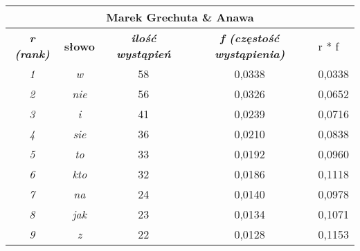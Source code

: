 \documentclass[a4paper]{article}
\begin{document}
\begin{table}
\begin{tabular}{ccc|c|l|}
\hline
\multicolumn{5}{|c|}{\textbf{Marek Grechuta \& Anawa}}                                                                                                                              \\ \hline
\multicolumn{1}{|c|}{\textit{\textbf{r (rank)}}} & \multicolumn{1}{c|}{\textbf{słowo}}    & \textit{\textbf{ilość wystąpień}} & \textit{\textbf{f (częstość wystąpienia)}} & r * f  \\ \hline
\multicolumn{1}{|c|}{\textit{1}}                 & \multicolumn{1}{c|}{\textit{w}}        & 58                                & 0,0338                                     & 0,0338 \\ \hline
\multicolumn{1}{|c|}{\textit{2}}                 & \multicolumn{1}{c|}{\textit{nie}}      & 56                                & 0,0326                                     & 0,0652 \\ \hline
\multicolumn{1}{|c|}{\textit{3}}                 & \multicolumn{1}{c|}{\textit{i}}        & 41                                & 0,0239                                     & 0,0716 \\ \hline
\multicolumn{1}{|c|}{\textit{4}}                 & \multicolumn{1}{c|}{\textit{sie}}      & 36                                & 0,0210                                     & 0,0838 \\ \hline
\multicolumn{1}{|c|}{\textit{5}}                 & \multicolumn{1}{c|}{\textit{to}}       & 33                                & 0,0192                                     & 0,0960 \\ \hline
\multicolumn{1}{|c|}{\textit{6}}                 & \multicolumn{1}{c|}{\textit{kto}}      & 32                                & 0,0186                                     & 0,1118 \\ \hline
\multicolumn{1}{|c|}{\textit{7}}                 & \multicolumn{1}{c|}{\textit{na}}       & 24                                & 0,0140                                     & 0,0978 \\ \hline
\multicolumn{1}{|c|}{\textit{8}}                 & \multicolumn{1}{c|}{\textit{jak}}      & 23                                & 0,0134                                     & 0,1071 \\ \hline
\multicolumn{1}{|c|}{\textit{9}}                 & \multicolumn{1}{c|}{\textit{z}}        & 22                                & 0,0128                                     & 0,1153 \\ \hline

\end{tabular}
\end{table}
\end{document}
